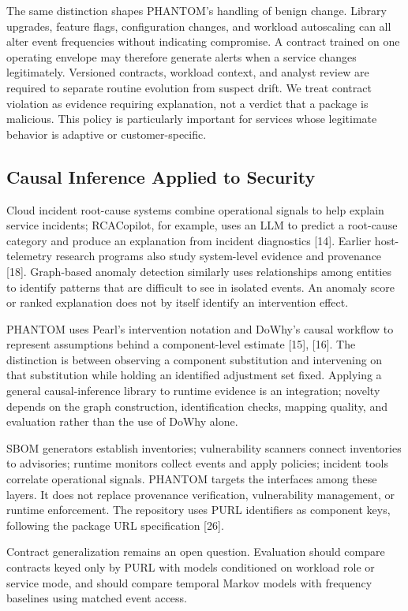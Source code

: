 \documentclass[conference]{IEEEtran}
\begin{document}
The same distinction shapes PHANTOM's handling of benign change. Library upgrades, feature flags, configuration changes, and workload autoscaling can all alter event frequencies without indicating compromise. A contract trained on one operating envelope may therefore generate alerts when a service changes legitimately. Versioned contracts, workload context, and analyst review are required to separate routine evolution from suspect drift. We treat contract violation as evidence requiring explanation, not a verdict that a package is malicious. This policy is particularly important for services whose legitimate behavior is adaptive or customer-specific.

\subsection{Causal Inference Applied to Security}
Cloud incident root-cause systems combine operational signals to help explain service incidents; RCACopilot, for example, uses an LLM to predict a root-cause category and produce an explanation from incident diagnostics [14]. Earlier host-telemetry research programs also study system-level evidence and provenance [18]. Graph-based anomaly detection similarly uses relationships among entities to identify patterns that are difficult to see in isolated events. An anomaly score or ranked explanation does not by itself identify an intervention effect.

PHANTOM uses Pearl's intervention notation and DoWhy's causal workflow to represent assumptions behind a component-level estimate [15], [16]. The distinction is between observing a component substitution and intervening on that substitution while holding an identified adjustment set fixed. Applying a general causal-inference library to runtime evidence is an integration; novelty depends on the graph construction, identification checks, mapping quality, and evaluation rather than the use of DoWhy alone.

SBOM generators establish inventories; vulnerability scanners connect inventories to advisories; runtime monitors collect events and apply policies; incident tools correlate operational signals. PHANTOM targets the interfaces among these layers. It does not replace provenance verification, vulnerability management, or runtime enforcement. The repository uses PURL identifiers as component keys, following the package URL specification [26].

Contract generalization remains an open question. Evaluation should compare contracts keyed only by PURL with models conditioned on workload role or service mode, and should compare temporal Markov models with frequency baselines using matched event access.
\end{document}
